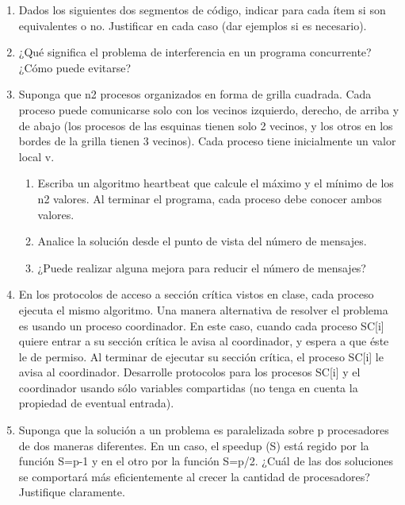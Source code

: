 \documentclass[a4paper, 10pt]{article}
\newenvironment{QandA}{
    \begin{enumerate}\bfseries}
    {\end{enumerate}
}
\begin{document}
\begin{QandA}

\item Dados los siguientes dos segmentos de código, indicar para cada ítem si son equivalentes o no. Justificar en cada caso (dar ejemplos si es necesario).

\item ¿Qué significa el problema de interferencia en un programa concurrente? ¿Cómo puede evitarse? 


\item Suponga que n2 procesos organizados en forma de grilla cuadrada. Cada proceso puede comunicarse solo con los vecinos izquierdo, derecho, de arriba y de abajo (los procesos de las esquinas tienen solo 2 vecinos, y los otros en los bordes de la grilla tienen 3 vecinos). Cada proceso tiene inicialmente un valor local v.
\begin{enumerate}
    \item Escriba un algoritmo heartbeat que calcule el máximo y el mínimo de los n2 valores. Al terminar el programa, cada proceso debe conocer ambos valores.
    \item Analice la solución desde el punto de vista del número de mensajes.
    \item ¿Puede realizar alguna mejora para reducir el número de mensajes?
\end{enumerate}


\item En los protocolos de acceso a sección crítica vistos en clase, cada proceso ejecuta el mismo algoritmo. Una manera alternativa de resolver el problema es usando un proceso coordinador. En este caso, cuando cada
proceso SC[i] quiere entrar a su sección crítica le avisa al coordinador, y espera a que éste le de permiso. Al
terminar de ejecutar su sección crítica, el proceso SC[i] le avisa al coordinador.
Desarrolle protocolos para los procesos SC[i] y el coordinador usando sólo variables compartidas (no
tenga en cuenta la propiedad de eventual entrada).


\item Suponga que la solución a un problema es paralelizada sobre p procesadores de dos maneras diferentes.
En un caso, el speedup (S) está regido por la función S=p-1 y en el otro por la función S=p/2. ¿Cuál de las
dos soluciones se comportará más eficientemente al crecer la cantidad de procesadores? Justifique
claramente.
\end{QandA}
\end{document}
